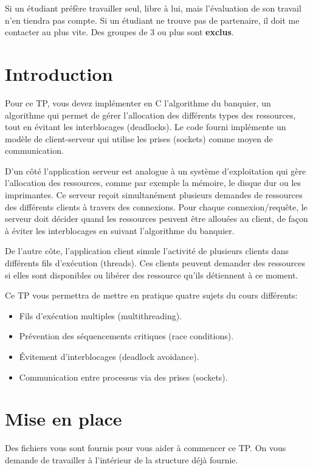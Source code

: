 \documentclass{article}
\begin{document}
Si un étudiant préfère travailler seul, libre à lui, mais l'évaluation de
son travail n'en tiendra pas compte.  Si un étudiant ne trouve pas de
partenaire, il doit me contacter au plus vite.  Des groupes de 3 ou plus
sont \textbf{exclus}.

\newpage
\section{Introduction}

Pour ce TP, vous devez implémenter en C l’algorithme du banquier, un
algorithme qui permet de gérer l’allocation des différents types des
ressources, tout en évitant les interblocages (deadlocks).  Le code fourni
implémente un modèle de client-serveur qui utilise les prises (sockets)
comme moyen de communication.

D’un côté l’application serveur est analogue à un système d’exploitation qui
gère l’allocation des ressources, comme par exemple la mémoire, le disque
dur ou les imprimantes.  Ce serveur reçoit simultanément plusieurs demandes
de ressources des différents clients à travers des connexions.  Pour chaque
connexion/requête, le serveur doit décider quand les ressources peuvent être
allouées au client, de façon à éviter les interblocages en suivant
l’algorithme du banquier.

De l’autre côte, l’application client simule l’activité de plusieurs clients
dans différents fils d’exécution (threads).  Ces clients peuvent demander des
ressources si elles sont disponibles ou libérer des ressource qu’ils
détiennent à ce moment.

Ce TP vous permettra de mettre en pratique quatre sujets du cours différents:
\begin{itemize}
\item Fils d’exécution multiples (multithreading).
\item Prévention des séquencements critiques (race conditions).
\item Évitement d’interblocages (deadlock avoidance).
\item Communication entre processus via des prises (sockets).
\end{itemize}

\section{Mise en place}

Des fichiers vous sont fournis pour vous aider à commencer ce TP.
On vous demande de travailler à l’intérieur de la structure déjà fournie.
\end{document}
